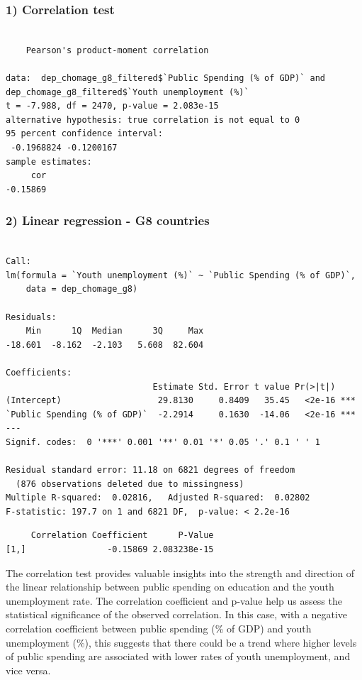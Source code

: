 \documentclass[
  letterpaper,
  DIV=11,
  numbers=noendperiod]{scrartcl}
\begin{document}
\hypertarget{correlation-test}{%
\subsubsection{1) Correlation test}\label{correlation-test}}

\begin{verbatim}

    Pearson's product-moment correlation

data:  dep_chomage_g8_filtered$`Public Spending (% of GDP)` and dep_chomage_g8_filtered$`Youth unemployment (%)`
t = -7.988, df = 2470, p-value = 2.083e-15
alternative hypothesis: true correlation is not equal to 0
95 percent confidence interval:
 -0.1968824 -0.1200167
sample estimates:
     cor 
-0.15869 
\end{verbatim}

\hypertarget{linear-regression---g8-countries}{%
\subsubsection{2) Linear regression - G8
countries}\label{linear-regression---g8-countries}}

\begin{verbatim}

Call:
lm(formula = `Youth unemployment (%)` ~ `Public Spending (% of GDP)`, 
    data = dep_chomage_g8)

Residuals:
    Min      1Q  Median      3Q     Max 
-18.601  -8.162  -2.103   5.608  82.604 

Coefficients:
                             Estimate Std. Error t value Pr(>|t|)    
(Intercept)                   29.8130     0.8409   35.45   <2e-16 ***
`Public Spending (% of GDP)`  -2.2914     0.1630  -14.06   <2e-16 ***
---
Signif. codes:  0 '***' 0.001 '**' 0.01 '*' 0.05 '.' 0.1 ' ' 1

Residual standard error: 11.18 on 6821 degrees of freedom
  (876 observations deleted due to missingness)
Multiple R-squared:  0.02816,   Adjusted R-squared:  0.02802 
F-statistic: 197.7 on 1 and 6821 DF,  p-value: < 2.2e-16
\end{verbatim}

\begin{verbatim}
     Correlation Coefficient      P-Value
[1,]                -0.15869 2.083238e-15
\end{verbatim}

The correlation test provides valuable insights into the strength and
direction of the linear relationship between public spending on
education and the youth unemployment rate. The correlation coefficient
and p-value help us assess the statistical significance of the observed
correlation. In this case, with a negative correlation coefficient
between public spending (\% of GDP) and youth unemployment (\%), this
suggests that there could be a trend where higher levels of public
spending are associated with lower rates of youth unemployment, and vice
versa.
\end{document}
